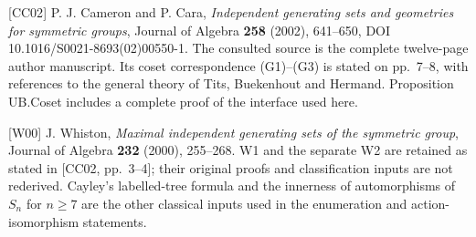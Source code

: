 {[}CC02{]} P. J. Cameron and P. Cara, \emph{Independent generating sets and geometries for symmetric groups}, Journal of Algebra \textbf{258} (2002), 641--650, DOI 10.1016/S0021-8693(02)00550-1. The consulted source is the complete twelve-page author manuscript. Its coset correspondence (G1)--(G3) is stated on pp.~7--8, with references to the general theory of Tits, Buekenhout and Hermand. Proposition UB.Coset includes a complete proof of the interface used here.

{[}W00{]} J. Whiston, \emph{Maximal independent generating sets of the symmetric group}, Journal of Algebra \textbf{232} (2000), 255--268. W1 and the separate W2 are retained as stated in {[}CC02, pp.~3--4{]}; their original proofs and classification inputs are not rederived. Cayley's labelled-tree formula and the innerness of automorphisms of \(S_n\) for \(n\geq7\) are the other classical inputs used in the enumeration and action-isomorphism statements.


